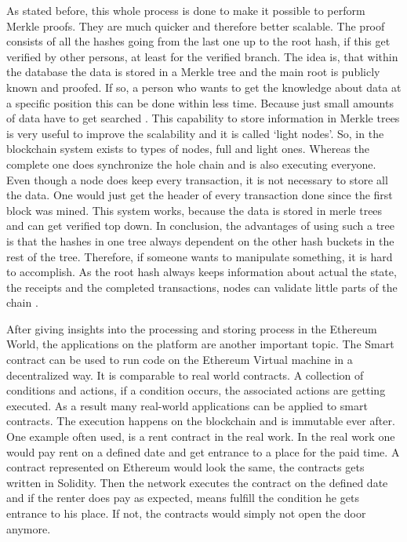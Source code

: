 As stated before, this whole process is done to make it possible to perform Merkle proofs. 
They are much quicker and therefore better scalable. 
The proof consists of all the hashes going from the last one up to the root hash, if this get verified by other persons, at least for the verified branch. 
The idea is, that within the database the data is stored in a Merkle tree and the main root is publicly known and proofed. 
If so, a person who wants to get the knowledge about data at a specific position this can be done within less time. 
Because just small amounts of data have to get searched \cite{Buterin2015}.
This capability to store information in Merkle trees is very useful to improve the scalability and it is called ‘light nodes’. 
So, in the blockchain system exists to types of nodes, full and light ones. 
Whereas the complete one does synchronize the hole chain and is also executing everyone. 
Even though a node does keep every transaction, it is not necessary to store all the data. 
One would just get the header of every transaction done since the first block was mined. 
This system works, because the data is stored in merle trees and can get verified top down. 
In conclusion, the advantages of using such a tree is that the hashes in one tree always dependent on the other hash buckets in the rest of the tree. 
Therefore, if someone wants to manipulate something, it is hard to accomplish. 
As the root hash always keeps information about actual the state, the receipts and the completed transactions, nodes can validate little parts of the chain \cite{Kasireddz2017}.

After giving insights into the processing and storing process in the Ethereum World, the applications on the platform are another important topic.
The Smart contract can be used to run code on the Ethereum Virtual machine in a decentralized way. 
It is comparable to real world contracts. 
A collection of conditions and actions, if a condition occurs, the associated actions are getting executed. 
As a result many real-world applications can be applied to smart contracts. 
The execution happens on the blockchain and is immutable ever after. 
One example often used, is a rent contract in the real work. 
In the real work one would pay rent on a defined date and get entrance to a place for the paid time. A contract represented on Ethereum would look the same, the contracts gets written in Solidity. 
Then the network executes the contract on the defined date and if the renter does pay as expected, means fulfill the condition he gets entrance to his place. If not, the contracts would simply not open the door anymore. 

